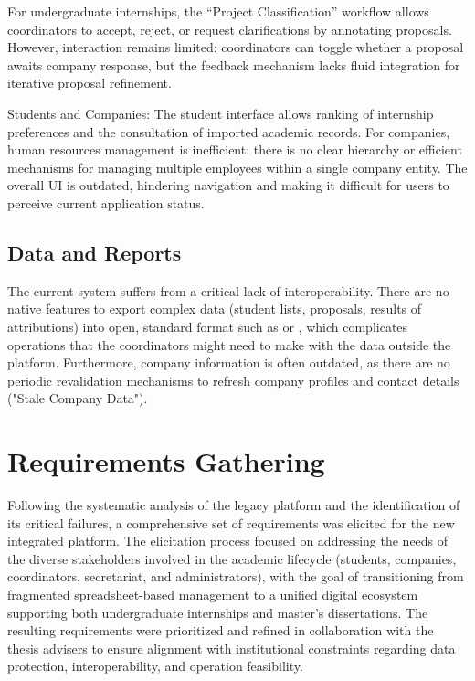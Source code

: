         {
            For undergraduate internships, the “Project Classification” workflow allows coordinators to accept, reject, or request clarifications by annotating proposals. 
            However, interaction remains limited: coordinators can toggle whether a proposal awaits company response, but the feedback mechanism lacks fluid integration for iterative proposal refinement.
        }

        {
            Students and Companies: The student interface allows ranking of internship preferences and the consultation of imported academic records. 
            For companies, human resources management is inefficient: there is no clear hierarchy or efficient mechanisms for managing multiple employees within a single company entity. 
            The overall \gls{UI} is outdated, hindering navigation and making it difficult for users to perceive current application status.
        }

    \subsection{Data and Reports}
        {
            The current system suffers from a critical lack of interoperability. 
            There are no native features to export complex data (student lists, proposals, results of attributions) into open, standard format such as  or , which complicates operations that the coordinators might need to make with the data outside the platform. 
            Furthermore, company information is often outdated, as there are no periodic revalidation mechanisms to refresh company profiles and contact details ("Stale Company Data").
        }

\section{Requirements Gathering}
\label{sec:reqs_gathering}
\ntindex[Template]{}
    {
        Following the systematic analysis of the legacy platform and the identification of its critical failures, a comprehensive set of requirements was elicited for the new integrated platform.
        The elicitation process focused on addressing the needs of the diverse stakeholders involved in the academic lifecycle (students, companies, coordinators, secretariat, and administrators),
        with the goal of transitioning from fragmented spreadsheet-based management to a unified digital ecosystem supporting both undergraduate internships and master's dissertations.
        The resulting requirements were prioritized and refined in collaboration with the thesis advisers to ensure alignment with institutional constraints regarding data protection, interoperability, 
        and operation feasibility.
    }


